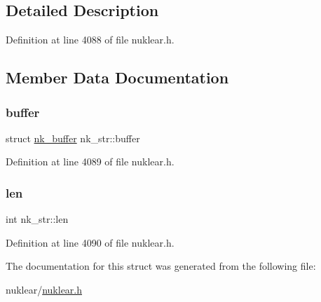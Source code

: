 \subsection{Detailed Description}


Definition at line 4088 of file nuklear.\+h.



\subsection{Member Data Documentation}
\mbox{\label{structnk__str_af09f932d4972189976784f9f6974e894}} 
\subsubsection{\texorpdfstring{buffer}{buffer}}
{\footnotesize\ttfamily struct \mbox{\hyperlink{structnk__buffer}{nk\+\_\+buffer}} nk\+\_\+str\+::buffer}



Definition at line 4089 of file nuklear.\+h.

\mbox{\label{structnk__str_a3190eef31e3749578754e537adb19610}} 
\subsubsection{\texorpdfstring{len}{len}}
{\footnotesize\ttfamily int nk\+\_\+str\+::len}



Definition at line 4090 of file nuklear.\+h.



The documentation for this struct was generated from the following file\+:\begin{DoxyCompactItemize}
\item 
nuklear/\mbox{\hyperlink{nuklear_8h}{nuklear.\+h}}\end{DoxyCompactItemize}
